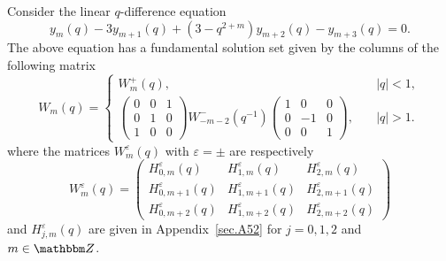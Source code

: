 \documentclass[12pt,reqno]{amsart}
\theoremstyle{definition}
\def\BZ{\mathbbm Z}
\def\ve{\varepsilon}
\begin{document}
Consider the linear $q$-difference equation 
\begin{equation}
  \label{52qdiff}
  y_m(q)-3y_{m+1}(q)+(3-q^{2+m})y_{m+2}(q) - y_{m+3}(q) = 0.
\end{equation}
The above equation has a fundamental solution set given by the
columns of the following matrix
\begin{equation}
  \label{52fund}
  W_m(q) =
  \begin{cases}
    W_m^+(q),\quad &|q|<1,\\
    \begin{pmatrix}
      0&0&1\\
      0&1&0\\
      1&0&0
    \end{pmatrix}
    W_{-m-2}^-(q^{-1})
    \begin{pmatrix}
      1&0&0\\
      0&-1&0\\
      0&0&1
    \end{pmatrix},\quad &|q|>1.
  \end{cases}
\end{equation}
where the matrices $W_m^\ve(q)$ with $\ve=\pm$ are respectively
\begin{equation}
  \label{52fund1}
  W^\ve_m(q) =
    \begin{pmatrix}
      H^{\ve}_{0,m}(q) & H^{\ve}_{1,m}(q) & H^{\ve}_{2,m}(q)       \\
      H^{\ve}_{0,m+1}(q) & H^{\ve}_{1,m+1}(q) & H^{\ve}_{2,m+1}(q) \\
      H^{\ve}_{0,m+2}(q) & H^{\ve}_{1,m+2}(q) & H^{\ve}_{2,m+2}(q)
    \end{pmatrix} 
\end{equation}
and $H^\ve_{j,m}(q)$ are given in Appendix~\ref{sec.A52} for $j=0,1,2$
and $m \in \BZ$.

\end{document}
